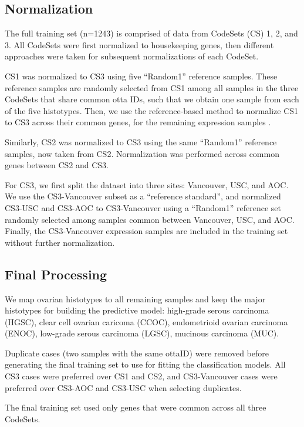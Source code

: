\documentclass[
]{report}
\begin{document}
\subsection{Normalization}\label{normalization}

The full training set (n=1243) is comprised of data from CodeSets (CS) 1, 2, and 3. All CodeSets were first normalized to housekeeping genes, then different approaches were taken for subsequent normalizations of each CodeSet.

CS1 was normalized to CS3 using five ``Random1'' reference samples. These reference samples are randomly selected from CS1 among all samples in the three CodeSets that share common otta IDs, such that we obtain one sample from each of the five histotypes. Then, we use the reference-based method to normalize CS1 to CS3 across their common genes, for the remaining expression samples \citet{talhouk2016}.

Similarly, CS2 was normalized to CS3 using the same ``Random1'' reference samples, now taken from CS2. Normalization was performed across common genes between CS2 and CS3.

For CS3, we first split the dataset into three sites: Vancouver, USC, and AOC. We use the CS3-Vancouver subset as a ``reference standard'', and normalized CS3-USC and CS3-AOC to CS3-Vancouver using a ``Random1'' reference set randomly selected among samples common between Vancouver, USC, and AOC. Finally, the CS3-Vancouver expression samples are included in the training set without further normalization.

\subsection{Final Processing}\label{final-processing}

We map ovarian histotypes to all remaining samples and keep the major histotypes for building the predictive model: high-grade serous carcinoma (HGSC), clear cell ovarian caricoma (CCOC), endometrioid ovarian carcinoma (ENOC), low-grade serous carcinoma (LGSC), mucinous carcinoma (MUC).

Duplicate cases (two samples with the same ottaID) were removed before generating the final training set to use for fitting the classification models. All CS3 cases were preferred over CS1 and CS2, and CS3-Vancouver cases were preferred over CS3-AOC and CS3-USC when selecting duplicates.

The final training set used only genes that were common across all three CodeSets.
\end{document}
